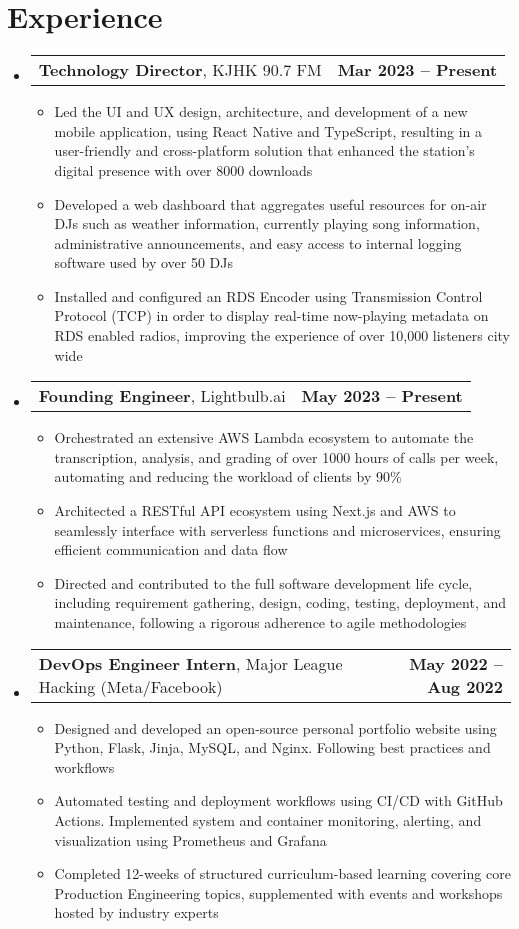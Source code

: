 \documentclass[letter,11pt]{article}
\makeatletter
\newcommand{\resumeItem}[1]{
	\item \small{{#1 \vspace{-2pt}}}
}
\newcommand{\resumeSubheading}[3]{
	\vspace{-2pt}\item
	\begin{tabular*}{1.0\textwidth}[t]{l@{\extracolsep{\fill}}r}
		\textbf{#1}, {\small #2} & \textbf{\small #3} \\
	\end{tabular*}\vspace{-5pt}
}
\newcommand{\resumeSubHeadingListStart}{\begin{itemize}[leftmargin=0.0in, label={}]}
\newcommand{\resumeSubHeadingListEnd}{\end{itemize}}
\newcommand{\resumeItemListStart}{\begin{itemize}[leftmargin=0.5cm]}
\newcommand{\resumeItemListEnd}{\end{itemize}\vspace{-5pt}}
\makeatother
\begin{document}
\section{Experience}
	\resumeSubHeadingListStart
		\resumeSubheading{Technology Director}{KJHK 90.7 FM}{Mar 2023 -- Present}
			\resumeItemListStart
				\resumeItem{Led the UI and UX design, architecture, and development of a new mobile application, using React Native and TypeScript, resulting in a user-friendly and cross-platform solution that enhanced the station's digital presence with over 8000 downloads}
				\resumeItem{Developed a web dashboard that aggregates useful resources for on-air DJs such as weather information, currently playing song information, administrative announcements, and easy access to internal logging software used by over 50 DJs}
				\resumeItem{Installed and configured an RDS Encoder using Transmission Control Protocol (TCP) in order to display real-time now-playing metadata on RDS enabled radios, improving the experience of over 10,000 listeners city wide}
			\resumeItemListEnd
		\resumeSubheading{Founding Engineer}{Lightbulb.ai}{May 2023 -- Present}
			\resumeItemListStart
				\resumeItem{Orchestrated an extensive AWS Lambda ecosystem to automate the transcription, analysis, and grading of over 1000 hours of calls per week, automating and reducing the workload of clients by 90\%}
				\resumeItem{Architected a RESTful API ecosystem using Next.js and AWS to seamlessly interface with serverless functions and microservices, ensuring efficient communication and data flow}
				\resumeItem{Directed and contributed to the full software development life cycle, including requirement gathering, design, coding, testing, deployment, and maintenance, following a rigorous adherence to agile methodologies}
			\resumeItemListEnd
		\resumeSubheading{DevOps Engineer Intern}{Major League Hacking (Meta/Facebook)}{May 2022 -- Aug 2022}
			\resumeItemListStart
				\resumeItem{Designed and developed an open-source personal portfolio website using Python, Flask, Jinja, MySQL, and Nginx. Following best practices and workflows}
				\resumeItem{Automated testing and deployment workflows using CI/CD with GitHub Actions. Implemented system and container monitoring, alerting, and visualization using Prometheus and Grafana}
				\resumeItem{Completed 12-weeks of structured curriculum-based learning covering core Production Engineering topics, supplemented with events and workshops hosted by industry experts}
			\resumeItemListEnd
	\resumeSubHeadingListEnd
\vspace{-15pt}
\end{document}

